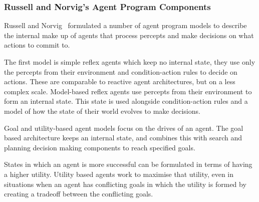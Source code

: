 \documentclass[]{final_report}
\begin{document}
\subsubsection{Russell and Norvig's Agent Program Components}
Russell and Norvig~\cite{russell2016artificial} formulated a number of agent program models to describe the internal make up of agents that process percepts and make decisions on what actions to commit to.\par
The first model is simple reflex agents which keep no internal state, they use only the percepts from their environment and condition-action rules to decide on actions. These are comparable to reactive agent architectures, but on a less complex scale. Model-based reflex agents use percepts from their environment to form an internal state. This state is used alongside condition-action rules and a model of how the state of their world evolves to make decisions.\par 
Goal and utility-based agent models focus on the drives of an agent. The goal based architecture keeps an internal state, and combines this with search and planning decision making components to reach specified goals.\par
States in which an agent is more successful can be formulated in terms of having a higher utility. Utility based agents work to maximise that utility, even in situations when an agent has conflicting goals in which the utility is formed by creating a tradeoff between the conflicting goals.
\end{document}
